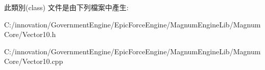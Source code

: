 此類別(class) 文件是由下列檔案中產生\+:\begin{DoxyCompactItemize}
\item 
C\+:/innovation/\+Government\+Engine/\+Epic\+Force\+Engine/\+Magnum\+Engine\+Lib/\+Magnum\+Core/Vector10.\+h\item 
C\+:/innovation/\+Government\+Engine/\+Epic\+Force\+Engine/\+Magnum\+Engine\+Lib/\+Magnum\+Core/Vector10.\+cpp\end{DoxyCompactItemize}
